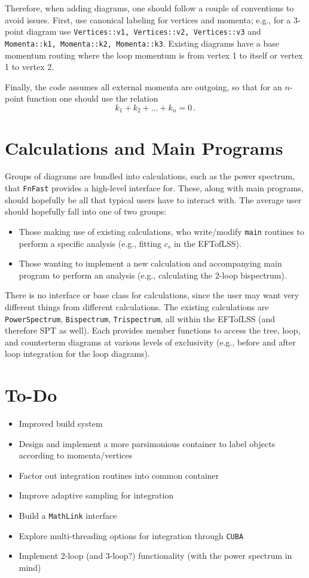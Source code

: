\documentclass[12pt]{article}
\newcommand{\fnfast}{\texttt{FnFast}\xspace}
\begin{document}
Therefore, when adding diagrams, one should follow a couple of conventions to avoid issues.  First, use canonical labeling for vertices and momenta; e.g., for a 3-point diagram use \texttt{Vertices::v1, Vertices::v2, Vertices::v3} and \texttt{Momenta::k1, Momenta::k2, Momenta::k3}.  Existing diagrams have a base momentum routing where the loop momentum is from vertex 1 to itself or vertex 1 to vertex 2.  

Finally, the code assumes all external momenta are outgoing, so that for an $n$-point function one should use the relation
\begin{equation*}
k_1 + k_2 + \ldots + k_n = 0 \,.
\end{equation*}

\section{Calculations and Main Programs}

Groups of diagrams are bundled into calculations, such as the power spectrum, that \fnfast provides a high-level interface for.  These, along with main programs, should hopefully be all that typical users have to interact with.  The average user should hopefully fall into one of two groups:
\begin{itemize}
\item Those making use of existing calculations, who write/modify \texttt{main} routines to perform a specific analysis (e.g., fitting $c_s$ in the EFTofLSS).
\item Those wanting to implement a new calculation and accompanying main program to perform an analysis (e.g., calculating the 2-loop bispectrum).
\end{itemize}
There is no interface or base class for calculations, since the user may want very different things from different calculations.  The existing calculations are \texttt{PowerSpectrum}, \texttt{Bispectrum}, \texttt{Trispectrum}, all within the EFTofLSS (and therefore SPT as well).  Each provides member functions to access the tree, loop, and counterterm diagrams at various levels of exclusivity (e.g., before and after loop integration for the loop diagrams).

\section{To-Do}

\begin{itemize}
\item Improved build system
\item Design and implement a more parsimonious container to label objects according to momenta/vertices
\item Factor out integration routines into common container
\item Improve adaptive sampling for integration
\item Build a \texttt{MathLink} interface
\item Explore multi-threading options for integration through \texttt{CUBA}
\item Implement 2-loop (and 3-loop?) functionality (with the power spectrum in mind)
\end{itemize}
\end{document}
